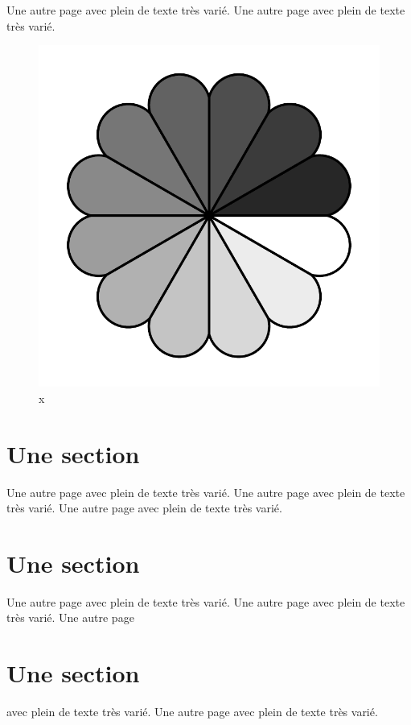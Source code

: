 \documentclass[11pt]{thesul}
\begin{document}
Une autre page avec plein de texte très varié.
Une autre page avec plein de texte très varié.
\begin{figure}[htb]
\includegraphics{rosette}
\caption{x}
\end{figure}

\section{Une section}

Une autre page avec plein de texte très varié.
Une autre page avec plein de texte très varié.
Une autre page avec plein de texte très varié.

\section{Une section}

Une autre page avec plein de texte très varié.
Une autre page avec plein de texte très varié.
Une autre page


\section{Une section}

avec plein de texte très varié.
Une autre page avec plein de texte très varié.
\end{document}
